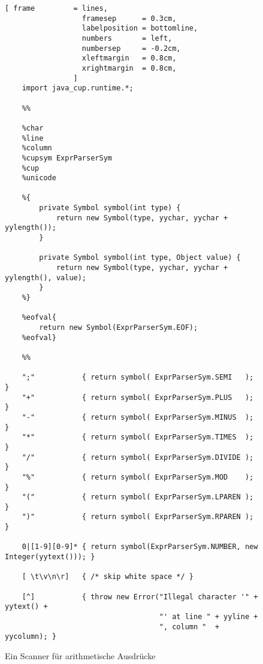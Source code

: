 \begin{figure}[!ht]
\centering
\begin{Verbatim}[ frame         = lines, 
                  framesep      = 0.3cm, 
                  labelposition = bottomline,
                  numbers       = left,
                  numbersep     = -0.2cm,
                  xleftmargin   = 0.8cm,
                  xrightmargin  = 0.8cm,
                ]
    import java_cup.runtime.*;
          
    %%
       
    %char
    %line
    %column
    %cupsym ExprParserSym
    %cup
    %unicode
       
    %{   
        private Symbol symbol(int type) {
            return new Symbol(type, yychar, yychar + yylength());
        }
        
        private Symbol symbol(int type, Object value) {
            return new Symbol(type, yychar, yychar + yylength(), value);
        }
    %}
    
    %eofval{
        return new Symbol(ExprParserSym.EOF);
    %eofval}
       
    %%
       
    ";"           { return symbol( ExprParserSym.SEMI   ); } 
    "+"           { return symbol( ExprParserSym.PLUS   ); }
    "-"           { return symbol( ExprParserSym.MINUS  ); }
    "*"           { return symbol( ExprParserSym.TIMES  ); }
    "/"           { return symbol( ExprParserSym.DIVIDE ); }
    "%"           { return symbol( ExprParserSym.MOD    ); }
    "("           { return symbol( ExprParserSym.LPAREN ); }
    ")"           { return symbol( ExprParserSym.RPAREN ); }
    
    0|[1-9][0-9]* { return symbol(ExprParserSym.NUMBER, new Integer(yytext())); }
    
    [ \t\v\n\r]   { /* skip white space */ }   
    
    [^]           { throw new Error("Illegal character '" + yytext() + 
                                    "' at line " + yyline + 
                                    ", column "  + yycolumn); }
\end{Verbatim}
\vspace*{-0.3cm}
\caption{Ein Scanner f\"ur arithmetische Ausdr\"ucke}
\label{fig:calc.jflex}
\end{figure}

